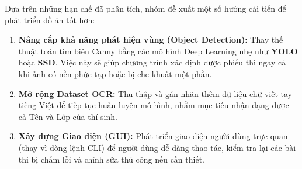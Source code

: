 \documentclass[6pt, a4paper]{report}
\begin{document}
	Dựa trên những hạn chế đã phân tích, nhóm đề xuất một số hướng cải tiến để phát triển đồ án tốt hơn:
	
	\begin{enumerate}
		\item \textbf{Nâng cấp khả năng phát hiện vùng (Object Detection):} Thay thế thuật toán tìm biên Canny bằng các mô hình Deep Learning nhẹ như \textbf{YOLO} hoặc \textbf{SSD}. Việc này sẽ giúp chương trình xác định được phiếu thi ngay cả khi ảnh có nền phức tạp hoặc bị che khuất một phần.
		
		\item \textbf{Mở rộng Dataset OCR:} Thu thập và gán nhãn thêm dữ liệu chữ viết tay tiếng Việt để tiếp tục huấn luyện mô hình, nhằm mục tiêu nhận dạng được cả Tên và Lớp của thí sinh.
		
		\item \textbf{Xây dựng Giao diện (GUI):} Phát triển giao diện người dùng trực quan (thay vì dòng lệnh CLI) để người dùng dễ dàng thao tác, kiểm tra lại các bài thi bị chấm lỗi và chỉnh sửa thủ công nếu cần thiết.
	\end{enumerate}
	
	\newpage
	
\end{document}
